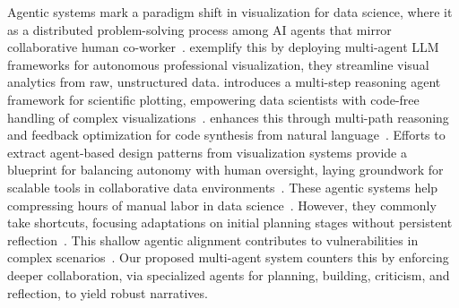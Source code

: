 Agentic systems mark a paradigm shift in visualization for data science, where it as a distributed problem-solving process among AI agents that mirror collaborative human co-worker~\citep{sapkota2025ai,tran2025multi,wolter2025multi,10.1145/3712335.3712410}.
\citep{goswami2025plotgen,zhang2025data} exemplify this by deploying multi-agent LLM frameworks for autonomous professional visualization, they streamline visual analytics from raw, unstructured data.
\citeauthor{yang2024matplotagent} introduces a multi-step reasoning agent framework for scientific plotting, empowering data scientists with code-free handling of complex visualizations~\citep{yang2024matplotagent}. 
\citeauthor{seo2025automated} enhances this through multi-path reasoning and feedback optimization for code synthesis from natural language~\citep{seo2025automated}. 
Efforts to extract agent-based design patterns from visualization systems provide a blueprint for balancing autonomy with human oversight, laying groundwork for scalable tools in collaborative data environments~\citep{dhanoa2025agentic}.
These agentic systems help compressing hours of manual labor in data science~\citep{moss2025ai,gridach2025agentic}. However, they commonly take shortcuts, focusing adaptations on initial planning stages without persistent reflection~\citep{wang2025ai,sapkota2025ai}. This shallow agentic alignment contributes to vulnerabilities in complex scenarios~\citep{cemri2025multi,tian2025outlook}. 
Our proposed multi-agent system counters this by enforcing deeper collaboration, via specialized agents for planning, building, criticism, and reflection, to yield robust narratives. 


